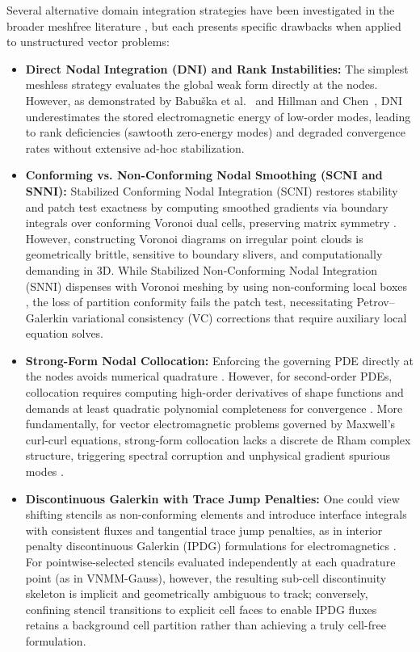 \documentclass[VANCOUVER]{USG}
\begin{document}
Several alternative domain integration strategies have been investigated in the broader meshfree literature \cite{hillman2018performance}, but each presents specific drawbacks when applied to unstructured vector problems:
\begin{itemize}
    \item \textbf{Direct Nodal Integration (DNI) and Rank Instabilities:} The simplest meshless strategy evaluates the global weak form directly at the nodes. However, as demonstrated by Babu{\v{s}}ka et al.~\cite{babuska2008quadrature} and Hillman and Chen~\cite{hillman2018performance}, DNI underestimates the stored electromagnetic energy of low-order modes, leading to rank deficiencies (sawtooth zero-energy modes) and degraded convergence rates without extensive ad-hoc stabilization.
    \item \textbf{Conforming vs. Non-Conforming Nodal Smoothing (SCNI and SNNI):} Stabilized Conforming Nodal Integration (SCNI) \cite{chen2001stabilized} restores stability and patch test exactness by computing smoothed gradients via boundary integrals over conforming Voronoi dual cells, preserving matrix symmetry \cite{hillman2018performance}. However, constructing Voronoi diagrams on irregular point clouds is geometrically brittle, sensitive to boundary slivers, and computationally demanding in 3D. While Stabilized Non-Conforming Nodal Integration (SNNI) dispenses with Voronoi meshing by using non-conforming local boxes \cite{hillman2018performance}, the loss of partition conformity fails the patch test, necessitating Petrov--Galerkin variational consistency (VC) corrections \cite{chen2013arbitrary, hillman2018performance} that require auxiliary local equation solves.
    \item \textbf{Strong-Form Nodal Collocation:} Enforcing the governing PDE directly at the nodes avoids numerical quadrature \cite{hillman2018performance}. However, for second-order PDEs, collocation requires computing high-order derivatives of shape functions and demands at least quadratic polynomial completeness for convergence \cite{hillman2018performance}. More fundamentally, for vector electromagnetic problems governed by Maxwell's curl-curl equations, strong-form collocation lacks a discrete de Rham complex structure, triggering spectral corruption and unphysical gradient spurious modes \cite{bossavit1990spurious, boffi2006finite}.
    \item \textbf{Discontinuous Galerkin with Trace Jump Penalties:} One could view shifting stencils as non-conforming elements and introduce interface integrals with consistent fluxes and tangential trace jump penalties, as in interior penalty discontinuous Galerkin (IPDG) formulations for electromagnetics \cite{houston2004mixed, hesthaven2004high}. For pointwise-selected stencils evaluated independently at each quadrature point (as in VNMM-Gauss), however, the resulting sub-cell discontinuity skeleton is implicit and geometrically ambiguous to track; conversely, confining stencil transitions to explicit cell faces to enable IPDG fluxes retains a background cell partition rather than achieving a truly cell-free formulation.

\end{itemize}
\end{document}
